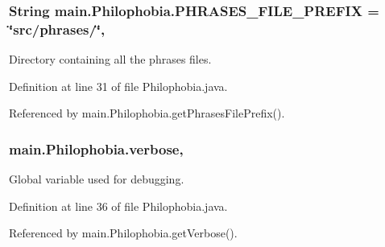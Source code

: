 \hypertarget{classmain_1_1_philophobia_a076b568405c08c4b22e22a1d7c985124}{
\subsubsection[{P\-H\-R\-A\-S\-E\-S\-\_\-\-F\-I\-L\-E\-\_\-\-P\-R\-E\-F\-I\-X}]{\setlength{\rightskip}{0pt plus 5cm}String main.\-Philophobia.\-P\-H\-R\-A\-S\-E\-S\-\_\-\-F\-I\-L\-E\-\_\-\-P\-R\-E\-F\-I\-X = \char`\"{}src/phrases/\char`\"{}\hspace{0.3cm}{\ttfamily [static]}, {\ttfamily [protected]}}}\label{classmain_1_1_philophobia_a076b568405c08c4b22e22a1d7c985124}


Directory containing all the phrases files. 



Definition at line 31 of file Philophobia.\-java.



Referenced by main.\-Philophobia.\-get\-Phrases\-File\-Prefix().

\hypertarget{classmain_1_1_philophobia_a83cf82b16e2feb6ede60c8c076be10ec}{
\subsubsection[{verbose}]{ main.\-Philophobia.\-verbose\hspace{0.3cm}{\ttfamily [static]}, {\ttfamily [protected]}}}\label{classmain_1_1_philophobia_a83cf82b16e2feb6ede60c8c076be10ec}


Global variable used for debugging. 



Definition at line 36 of file Philophobia.\-java.



Referenced by main.\-Philophobia.\-get\-Verbose().

